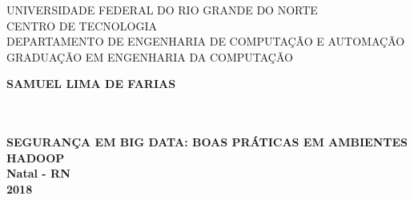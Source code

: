 \thispagestyle{empty}

\vfill
 \begin{center}

     UNIVERSIDADE FEDERAL DO RIO GRANDE DO NORTE \\
     CENTRO DE TECNOLOGIA \\
     DEPARTAMENTO DE ENGENHARIA DE COMPUTAÇÃO E AUTOMAÇÃO \\ 
     GRADUAÇÃO EM ENGENHARIA DA COMPUTAÇÃO  \\ 

    \vspace*{1in}
    \begin{large} \bfseries SAMUEL LIMA DE FARIAS \end{large}\\[0.4in]

    \vspace*{4cm}
    \noindent \\
    \large\bfseries{SEGURANÇA EM BIG DATA: BOAS PRÁTICAS EM AMBIENTES HADOOP} \\
    \vfill
    \large\bfseries{ Natal - RN \\ 2018}
\end{center}

\normalsize